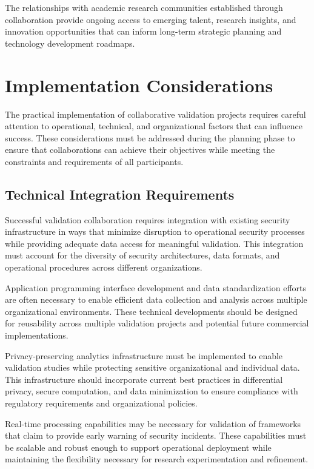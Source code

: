 \documentclass[10pt,twocolumn]{IEEEtran}
\begin{document}
The relationships with academic research communities established through collaboration provide ongoing access to emerging talent, research insights, and innovation opportunities that can inform long-term strategic planning and technology development roadmaps.

\section{Implementation Considerations}

The practical implementation of collaborative validation projects requires careful attention to operational, technical, and organizational factors that can influence success. These considerations must be addressed during the planning phase to ensure that collaborations can achieve their objectives while meeting the constraints and requirements of all participants.

\subsection{Technical Integration Requirements}

Successful validation collaboration requires integration with existing security infrastructure in ways that minimize disruption to operational security processes while providing adequate data access for meaningful validation. This integration must account for the diversity of security architectures, data formats, and operational procedures across different organizations.

Application programming interface development and data standardization efforts are often necessary to enable efficient data collection and analysis across multiple organizational environments. These technical developments should be designed for reusability across multiple validation projects and potential future commercial implementations.

Privacy-preserving analytics infrastructure must be implemented to enable validation studies while protecting sensitive organizational and individual data. This infrastructure should incorporate current best practices in differential privacy, secure computation, and data minimization to ensure compliance with regulatory requirements and organizational policies.

Real-time processing capabilities may be necessary for validation of frameworks that claim to provide early warning of security incidents. These capabilities must be scalable and robust enough to support operational deployment while maintaining the flexibility necessary for research experimentation and refinement.
\end{document}
